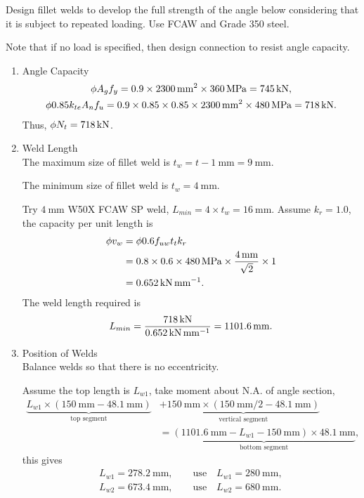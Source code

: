 \begin{exmp}
Design fillet welds to develop the full strength of the angle below considering that it is subject to repeated loading. Use FCAW and Grade 350 steel.

Note that if no load is specified, then design connection to resist angle capacity.
\begin{figure}[H]

\end{figure}
\end{exmp}
\begin{solution}
\begin{enumerate}
\item Angle Capacity
\begin{gather*}
\phi{}A_gf_y=0.9\times\SI{2300}{\milli\meter^2}\times\SI{360}{\mega\pascal}=\SI{745}{\kilo\newton},\\
\phi0.85k_{te}A_nf_u=0.9\times0.85\times0.85\times\SI{2300}{\milli\meter^2}\times\SI{480}{\mega\pascal}=\SI{718}{\kilo\newton}.
\end{gather*}
Thus, $\phi{}N_t=\SI{718}{\kilo\newton}$.
\item Weld Length\\
The maximum size of fillet weld is $t_w=t-\SI{1}{\mm}=\SI{9}{\mm}$.

The minimum size of fillet weld is $t_w=\SI{4}{\mm}$.

Try $\SI{4}{\mm}$ W50X FCAW SP weld, $L_{min}=4\times{}t_w=\SI{16}{\mm}$. Assume $k_r=1.0$, the capacity per unit length is
\begin{align*}
\phi{}v_w&=\phi{}0.6f_{uw}t_tk_r\\
&=0.8\times0.6\times\SI{480}{\mega\pascal}\times\dfrac{\SI{4}{\milli\meter}}{\sqrt{2}}\times1\\
&=\SI{0.652}{\kilo\newton\per\milli\meter}.
\end{align*}
The weld length required is
\begin{gather*}
L_{min}=\dfrac{\SI{718}{\kilo\newton}}{\SI{0.652}{\kilo\newton\per\milli\meter}}=\SI{1101.6}{\milli\meter}.
\end{gather*}
\item Position of Welds\\
Balance welds so that there is no eccentricity.
\begin{figure}[H]
\centering

\end{figure}
Assume the top length is $L_{w1}$, take moment about N.A. of angle section,
\begin{align*}
\underbrace{L_{w1}\times\left(\SI{150}{\mm}-\SI{48.1}{\mm}\right)}_\text{top segment}&+\underbrace{\SI{150}{\mm}\times\left(\SI{150}{\mm}/2-\SI{48.1}{\mm}\right)}_\text{vertical segment}\\&=\underbrace{\left(\SI{1101.6}{\mm}-L_{w1}-\SI{150}{\mm}\right)\times\SI{48.1}{\mm}}_\text{bottom segment},
\end{align*}
this gives
\begin{gather*}
L_{w1}=\SI{278.2}{\mm},\qquad\text{use}\quad{}L_{w1}=\SI{280}{\mm},\\
L_{w2}=\SI{673.4}{\mm},\qquad\text{use}\quad{}L_{w2}=\SI{680}{\mm}.
\end{gather*}


\end{enumerate}
\end{solution}
